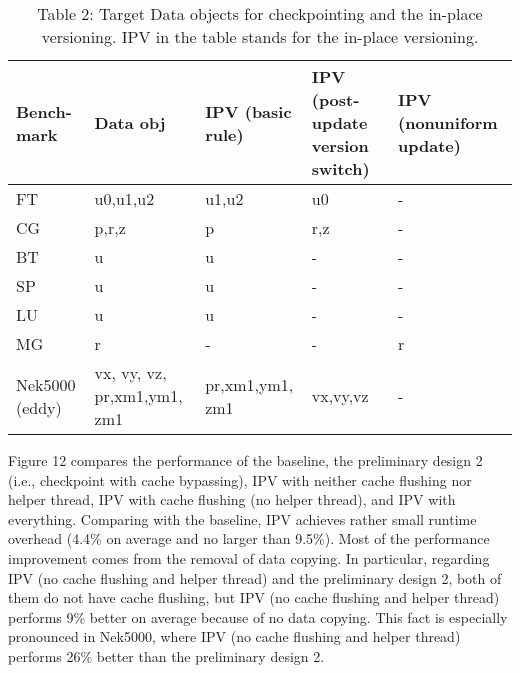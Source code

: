 \begin{table}
\centering
\footnotesize 
\caption*{Table 2: Target Data objects for checkpointing and the in-place versioning. IPV in the table stands for the in-place versioning.}
\vspace{-10pt}
\begin{tabular}{|p{1.0cm}|p{1.1cm}|p{1.3cm}|p{1.9cm}|p{1.5cm}|}
       \hline
       \textbf{Bench-mark} & \textbf{Data obj} & \textbf{IPV (basic rule)} & \textbf{IPV (post-update version switch)} & \textbf{IPV (nonuniform update)} \\
        \hline \hline
      FT & u0,u1,u2 & u1,u2 & u0 & -  \\  \hline
      CG & p,r,z & p & r,z & -    \\  \hline
        BT & u & u & - & -    \\  \hline
        SP & u & u & - & -    \\  \hline
        LU & u & u & - & -    \\ \hline
        MG & r & - &  -& r   \\ \hline
        Nek5000 (eddy) & vx, vy, vz, pr,xm1,ym1, zm1 & pr,xm1,ym1, zm1 & vx,vy,vz & -  \\ \hline
\end{tabular}
\label{tab:benchmarks}
\vspace{-20pt}
\end{table}

\begin{comment}
Result 1: performance results for WBINVD+dual version (1/8). Baseline
includes native execution and optimized preliminary design (SSE2).


Result 3: How much is overlapped during async cache flush. The overhead of WBINVD.
\end{comment}

Figure 12 compares the performance of 
the baseline, the preliminary design 2 (i.e., checkpoint with cache bypassing), IPV with neither cache flushing nor helper thread, IPV with cache flushing (no helper thread), and IPV with everything.
Comparing with the baseline, IPV achieves rather small runtime overhead (4.4\% on average and no larger than 9.5\%). Most of the performance improvement comes from the removal of data copying. In particular, regarding IPV (no cache flushing and helper thread) and the preliminary design 2, both of them do not have cache flushing, but IPV (no cache flushing and helper thread) performs 9\% better on average because of no data copying. This fact is especially pronounced in Nek5000, where IPV (no cache flushing and helper thread) performs 26\% better than the preliminary design 2. 

